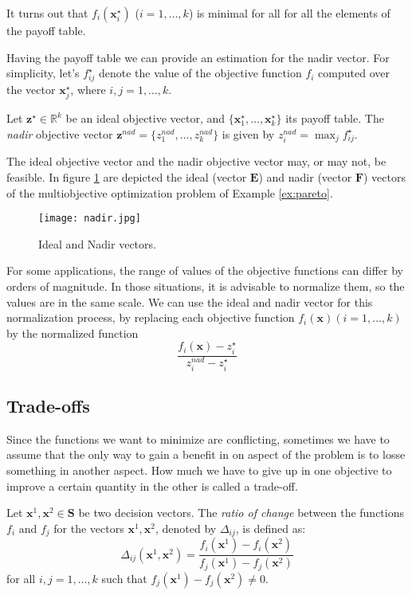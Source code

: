 {It turns out that $f_i \left( \mathbf{x}^\star_i \right)$ ($i = 1, \ldots, k$) is minimal for all for all the elements of the payoff table.

Having the payoff table we can provide an estimation for the nadir vector. For simplicity, let's $f^\star_{ij}$ denote the value of the objective function $f_i$ computed over the vector $\mathbf{x}^\star_j$, where $i, j = 1, \ldots, k$.

\begin{definition}
Let $\mathbf{z}^\star \in \mathbb{R}^k$ be an ideal objective vector, and $\{ \mathbf{x}^\star_1, \ldots, \mathbf{x}^\star_k \}$ its payoff table. The \emph{nadir} objective vector $\mathbf{z}^{nad} = \{ z^{nad}_1, \ldots, z^{nad}_k \}$ is given by $z^{nad}_i = \max_j f^\star_{ij}$.
\end{definition}

The ideal objective vector and the nadir objective vector may, or may not, be feasible. In figure \ref{fig:nadir} are depicted the ideal (vector $\mathbf{E}$) and nadir (vector $\mathbf{F}$) vectors of the multiobjective optimization problem of Example \ref{ex:pareto}.

\begin{figure}[h]
\centering\texttt{[image: nadir.jpg]}
\caption{\label{fig:nadir}Ideal and Nadir vectors.}
\end{figure}

For some applications, the range of values of the objective functions can differ by orders of magnitude. In those situations, it is advisable to normalize them, so the values are in the same scale. We can use the ideal and nadir vector for this normalization process, by replacing each objective function $f_i (\mathbf{x}) (i = 1, \ldots, k)$ by the normalized function
\[
\frac{f_i(\mathbf{x}) - z^\star_i}{z^{nad}_i - z^\star_i}
\]


\subsection{Trade-offs}

Since the functions we want to minimize are conflicting, sometimes we have to assume that the only way to gain a benefit in on aspect of the problem is to losse something in another aspect. How much we have to give up in one objective to improve a certain quantity in the other is called a trade-off.

\begin{definition}
Let $\mathbf{x}^1, \mathbf{x}^2 \in \mathbf{S}$ be two decision vectors. The \emph{ratio of change} between the functions $f_i$ and $f_j$ for the vectors $\mathbf{x}^1, \mathbf{x}^2$, denoted by $\Delta_{ij}$, is defined as:
\[
\Delta_{ij} ( \mathbf{x}^1, \mathbf{x}^2 ) = \frac{f_i(\mathbf{x}^1) - f_i(\mathbf{x}^2)}{f_j(\mathbf{x}^1) - f_j(\mathbf{x}^2)}
\] 
for all $i, j = 1, \ldots, k$ such that $f_j(\mathbf{x}^1) - f_j(\mathbf{x}^2) \neq 0$.
\end{definition}

}
